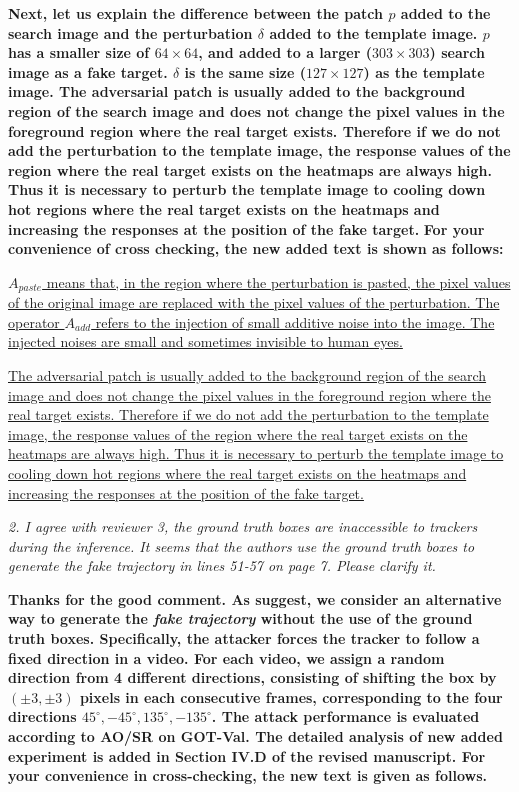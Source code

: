 \documentclass[12pt]{article}
\begin{document}
\textbf{Next, let us explain the difference between the patch $p$ added to the search image and the perturbation $\delta$ added to the template image. $p$ has a smaller size of $64\times 64$, and added to a larger ($303\times 303$) search image as a fake target.
$\delta$ is the same size ($127\times 127$) as the template image.
The adversarial patch is usually added to the background region of the search image and does not change the pixel values in the foreground region where the real target exists. Therefore if we do not add the perturbation to the template image, the response values of the region where the real target exists on the heatmaps are always high. Thus it is necessary to perturb the template image to cooling down hot regions where the real target exists on the heatmaps and increasing the responses at the position of the fake target.
}
\textbf{For your convenience of cross checking, the new added text is shown as follows:}

\uline{
$A_{paste}$ means that, in the region where the perturbation is pasted, the pixel values of the original image are replaced with the pixel values of the perturbation.
The operator $A_{add}$ refers to the injection of small additive noise into the image. The injected noises are small and sometimes invisible to human eyes.}

\uline{
The adversarial patch is usually added to the background region of the search image and does not change the pixel values in the foreground region where the real target exists. Therefore if we do not add the perturbation to the template image, the response values of the region where the real target exists on the heatmaps are always high. Thus it is necessary to perturb the template image to cooling down hot regions where the real target exists on the heatmaps and increasing the responses at the position of the fake target.
}


\textit{2. I agree with reviewer 3, the ground truth boxes are inaccessible to trackers during the inference. It seems that the authors use the ground truth boxes to generate the fake trajectory in lines 51-57 on page 7. Please clarify it.}

\textbf{
Thanks for the good comment. As suggest, we consider an alternative way to generate the \textit{fake trajectory} without the use of the ground truth boxes.
Specifically, the attacker forces the tracker to follow a fixed direction in a video. For each video, we assign a random direction from 4 different directions, consisting of shifting the box by $(\pm 3, \pm 3)$ pixels in each consecutive frames, corresponding to the four directions $45^{\circ}, -45^{\circ}, 135^{\circ}, -135^{\circ}$.
The attack performance is evaluated according to AO/SR on GOT-Val.
The detailed analysis of new added experiment is added in Section IV.D of the revised manuscript. For your convenience in cross-checking, the new text is given as follows.}
\end{document}
